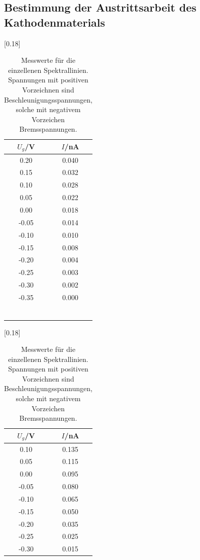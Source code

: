 \subsection{Bestimmung der Austrittsarbeit des Kathodenmaterials}
\begin{table}
  \centering
  \caption{Messwerte für die einzellenen Spektrallinien. Spannungen mit positiven
  Vorzeichnen sind Beschleunigungsspannungen, solche mit negativem Vorzeichen
  Bremsspannungen.}
  \label{tab:1}
  [0.18\textwidth]{
    \begin{tabular}{c c}
      \toprule
      $U_g$/\si{\volt} & $I$/\si{\nano\ampere}\\
      \midrule
      0.20 & 0.040 \\
      0.15 & 0.032 \\
      0.10 & 0.028 \\
      0.05 & 0.022 \\
      0.00 & 0.018 \\
      -0.05 & 0.014 \\
      -0.10 & 0.010 \\
      -0.15 & 0.008 \\
      -0.20 & 0.004 \\
      -0.25 & 0.003 \\
      -0.30 & 0.002 \\
      -0.35 & 0.000 \\
      \\
      \\
      \\
      \\
      \\
      \\
      \bottomrule
    \end{tabular}
    }
  [0.18\textwidth]{
    \begin{tabular}{c c}
      \toprule
      $U_g$/\si{\volt} & $I$/\si{\nano\ampere}\\
      \midrule
      0.10 & 0.135 \\
      0.05 & 0.115 \\
      0.00 & 0.095 \\
      -0.05 & 0.080 \\
      -0.10 & 0.065 \\
      -0.15 & 0.050 \\
      -0.20 & 0.035 \\
      -0.25 & 0.025 \\
      -0.30 & 0.015 \\

\end{tabular}}
\end{table}

